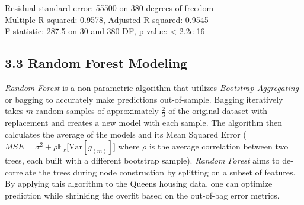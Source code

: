 \documentclass[12pt]{article}
\begin{document}
\begin{table}[ht]
Residual standard error: 55500 on 380 degrees of freedom \\
Multiple R-squared:  0.9578,	Adjusted R-squared:  0.9545 \\
F-statistic: 287.5 on 30 and 380 DF,  p-value: < 2.2e-16 
\end{table}


\subsection*{3.3 Random Forest Modeling}


\emph{Random Forest} is a non-parametric algorithm that utilizes \emph{Bootstrap Aggregating} or bagging to accurately make predictions out-of-sample. Bagging iteratively takes $m$ random samples of approximately $\frac{2}{3}$ of the original dataset with replacement and creates a new model with each sample. The algorithm then calculates the average of the models and its Mean Squared Error ($MSE = \sigma^2 + \rho \mathbb{E}_x \big[\text{Var}[g_{(m)}] \big]$ where $\rho$ is the average correlation between two trees, each built with a different bootstrap sample). \emph{Random Forest} aims to de-correlate the trees during node construction by splitting on a subset of features. By applying this algorithm to the Queens housing data, one can optimize prediction while shrinking the overfit based on the out-of-bag error metrics. 
\end{document}
